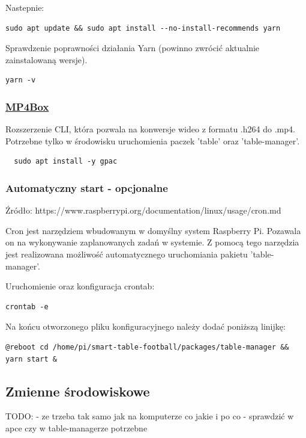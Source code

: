 Nastepnie:
\begin{lstlisting}
sudo apt update && sudo apt install --no-install-recommends yarn
\end{lstlisting}

Sprawdzenie poprawności działania Yarn (powinno zwrócić aktualnie zainstalowaną wersje).
\begin{lstlisting}
yarn -v
\end{lstlisting}


\subsubsection{\href{https://www.raspberrypi.org/documentation/usage/camera/raspicam/raspivid.md}{MP4Box}}

Rozszerzenie CLI, która pozwala na konwersje wideo z formatu .h264 do .mp4. Potrzebne tylko w środowisku uruchomienia paczek 'table' oraz 'table-manager'.

\begin{lstlisting}
  sudo apt install -y gpac
\end{lstlisting}


\subsubsection{Automatyczny start - opcjonalne}
Źródło: https://www.raspberrypi.org/documentation/linux/usage/cron.md

Cron jest narzędziem wbudowanym w domyślny system Raspberry Pi. Pozawala on na wykonywanie zaplanowanych zadań w systemie. Z pomocą tego narzędzia jest realizowana możliwość automatycznego uruchomiania pakietu 'table-manager'.

Uruchomienie oraz konfiguracja crontab:
\begin{lstlisting}
crontab -e
\end{lstlisting}

Na końcu otworzonego pliku konfiguracyjnego należy dodać poniższą linijkę:
\begin{lstlisting}[breaklines=true]
@reboot cd /home/pi/smart-table-football/packages/table-manager && yarn start &
\end{lstlisting}

\subsection{Zmienne środowiskowe}
TODO:
- ze trzeba tak samo jak na komputerze co jakie i po co
- sprawdzić w apce czy w table-managerze potrzebne


